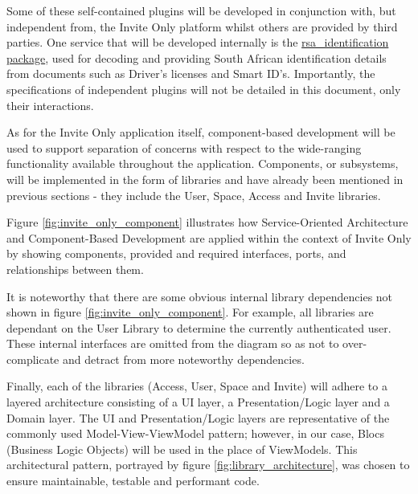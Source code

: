 Some of these self-contained plugins will be developed in conjunction with, but independent from, the Invite Only platform whilst others are provided by third parties. One service that will be developed internally is the \href{https://pub.dev/packages/rsa\_identification}{rsa\_identification package}, used for decoding and providing South African identification details from documents such as Driver's licenses and Smart ID's. Importantly, the specifications of independent plugins will not be detailed in this document, only their interactions.

As for the Invite Only application itself, component-based development will be used to support separation of concerns with respect to the wide-ranging functionality available throughout the application. Components, or subsystems, will be implemented in the form of libraries and have already been mentioned in previous sections - they include the User, Space, Access and Invite libraries.

Figure \ref{fig:invite_only_component} illustrates how Service-Oriented Architecture and Component-Based Development are applied within the context of Invite Only by showing components, provided and required interfaces, ports, and relationships between them.

It is noteworthy that there are some obvious internal library dependencies not shown in figure \ref{fig:invite_only_component}. For example, all libraries are dependant on the User Library to determine the currently authenticated user. These internal interfaces are omitted from the diagram so as not to over-complicate and detract from more noteworthy dependencies.

Finally, each of the libraries (Access, User, Space and Invite) will adhere to a layered architecture consisting of a UI layer, a Presentation/Logic layer and a Domain layer. The UI and Presentation/Logic layers are representative of the commonly used Model-View-ViewModel pattern; however, in our case, Blocs (Business Logic Objects) will be used in the place of ViewModels. This architectural pattern, portrayed by figure \ref{fig:library_architecture}, was chosen to ensure maintainable, testable and performant code.

